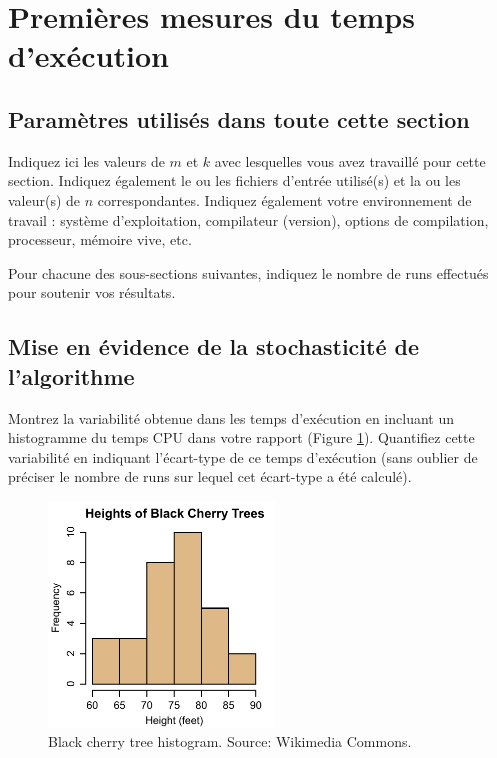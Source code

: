 
\section{Premières mesures du temps d'exécution}

\subsection{Paramètres utilisés dans toute cette section}
Indiquez ici les valeurs de $m$ et $k$ avec lesquelles vous avez travaillé pour cette section. Indiquez également le ou les fichiers d'entrée utilisé(s) et la ou les valeur(s) de $n$ correspondantes. Indiquez également votre environnement de travail : système d'exploitation, compilateur (version), options de compilation, processeur, mémoire vive, etc. 

Pour chacune des sous-sections suivantes, indiquez le nombre de runs effectués pour soutenir vos résultats.

\subsection{Mise en évidence de la stochasticité de l'algorithme}
Montrez la variabilité obtenue dans les temps d'exécution en incluant un histogramme du temps CPU dans votre rapport (Figure \ref{fig:histo-variabilite}). Quantifiez cette variabilité en indiquant l'écart-type de ce temps d'exécution (sans oublier de préciser le nombre de runs sur lequel cet écart-type a été calculé). 

\begin{figure}[htbp]
	\begin{center}
		\includegraphics[width=6cm]{Black_cherry_tree_histogram.pdf}
		\caption{Black cherry tree histogram. Source: Wikimedia Commons.}
		\label{fig:histo-variabilite}
	\end{center}
\end{figure}


